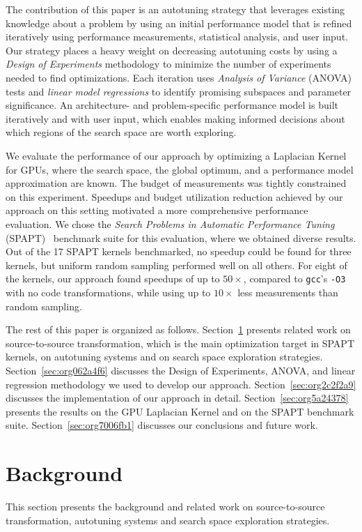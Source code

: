 \documentclass[conference]{IEEEtran}
\begin{document}
The contribution of this paper is an autotuning strategy that leverages existing
knowledge about a problem by using an initial performance model that is refined
iteratively using performance measurements, statistical analysis, and user
input. Our strategy places a heavy weight on decreasing autotuning costs by
using a \emph{Design of Experiments} methodology to minimize the number of
experiments needed to find optimizations. Each iteration uses \emph{Analysis of
Variance} (ANOVA) tests and \emph{linear model regressions} to identify promising
subspaces and parameter significance. An architecture- and problem-specific
performance model is built iteratively and with user input, which enables making
informed decisions about which regions of the search space are worth exploring.

We evaluate the performance of our approach by optimizing a Laplacian Kernel for
GPUs, where the search space, the global optimum, and a performance model
approximation are known. The budget of measurements was tightly constrained on
this experiment. Speedups and budget utilization reduction achieved by our
approach on this setting motivated a more comprehensive performance evaluation.
We chose the \emph{Search Problems in Automatic Performance Tuning}
(SPAPT)~\cite{balaprakash2012spapt} benchmark suite for this evaluation,
where we obtained diverse results. Out of the 17 SPAPT kernels benchmarked, no
speedup could be found for three kernels, but uniform random sampling performed
well on all others. For eight of the kernels, our approach found speedups of up
to \(50\times\), compared to \texttt{gcc}'s \texttt{-O3} with no code transformations, while
using up to \(10\times\) less measurements than random sampling.

The rest of this paper is organized as follows. Section~\ref{sec:org158a289}
presents related work on source-to-source transformation, which is the main
optimization target in SPAPT kernels, on autotuning systems and on search space
exploration strategies. Section~\ref{sec:org062a4f6} discusses the Design
of Experiments, ANOVA, and linear regression methodology we used to develop our
approach. Section~\ref{sec:org2c2f2a9} discusses the
implementation of our approach in detail. Section~\ref{sec:org5a24378}
presents the results on the GPU Laplacian Kernel and on the SPAPT benchmark
suite. Section~\ref{sec:org7006fb1} discusses our conclusions and future work.
\section{Background}
\label{sec:org158a289}
This section presents the background and related work on source-to-source
transformation, autotuning systems and search space exploration strategies.
\end{document}
